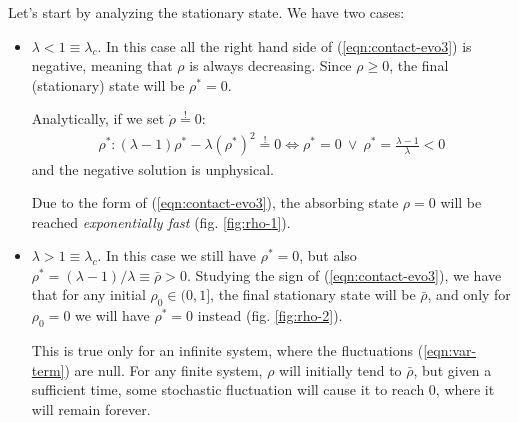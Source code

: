 \documentclass[../../main.tex]{subfiles}
\begin{document}
Let's start by analyzing the stationary state. We have two cases:
\begin{itemize}
    \item $\lambda < 1 \equiv \lambda_c$. In this case all the right hand side of (\ref{eqn:contact-evo3}) is negative, meaning that $\rho$ is always decreasing. Since $\rho \geq 0$, the final (stationary) state will be $\rho^* = 0$.
    
    \medskip

    Analytically, if we set $\dot{\rho} \overset{!}{=} 0$:
    \begin{align*}
        \rho^* \colon (\lambda - 1) \rho^* - \lambda (\rho^*)^2 \overset{!}{=}  0 \Leftrightarrow \rho^* = 0 \> \lor \> \rho^* = \frac{\lambda-1}{\lambda} < 0 
    \end{align*}
    and the negative solution is unphysical.

    \medskip

    Due to the form of (\ref{eqn:contact-evo3}), the absorbing state $\rho=0$ will be reached \textit{exponentially fast} (fig. \ref{fig:rho-1}).
    \item $\lambda > 1 \equiv \lambda_c$. In this case we still have $\rho^* = 0$, but also $\rho^* = (\lambda -1)/\lambda \equiv \bar{\rho} > 0$. Studying the sign of (\ref{eqn:contact-evo3}), we have that for any initial $\rho_0 \in (0,1]$, the final stationary state will be $\bar{\rho}$, and only for $\rho_0 = 0$ we will have $\rho^* = 0$ instead (fig. \ref{fig:rho-2}).

    \medskip

    This is true only for an infinite system, where the fluctuations (\ref{eqn:var-term}) are null. For any finite system, $\rho$ will initially tend to $\bar{\rho}$, but given a sufficient time, some stochastic fluctuation will cause it to reach $0$, where it will remain forever.
\end{itemize}
\end{document}
